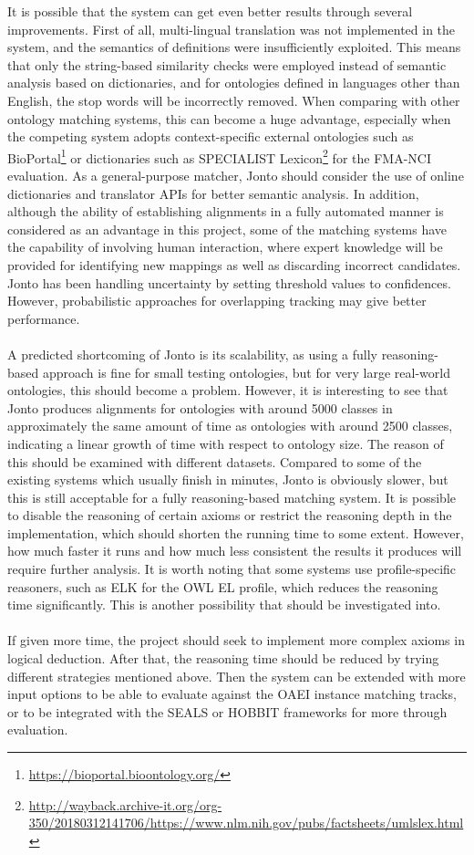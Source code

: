 It is possible that the system can get even better results through several improvements. First of all, multi-lingual translation was not implemented in the system, and the semantics of definitions were insufficiently exploited. This means that only the string-based similarity checks were employed instead of semantic analysis based on dictionaries, and for ontologies defined in languages other than English, the stop words will be incorrectly removed. When comparing with other ontology matching systems, this can become a huge advantage, especially when the competing system adopts context-specific external ontologies such as BioPortal\footnote{\url{https://bioportal.bioontology.org/}} or dictionaries such as SPECIALIST Lexicon\footnote{\url{http://wayback.archive-it.org/org-350/20180312141706/https://www.nlm.nih.gov/pubs/factsheets/umlslex.html}} for the FMA-NCI evaluation. As a general-purpose matcher, Jonto should consider the use of online dictionaries and translator APIs for better semantic analysis. In addition, although the ability of establishing alignments in a fully automated manner is considered as an advantage in this project, some of the matching systems have the capability of involving human interaction, where expert knowledge will be provided for identifying new mappings as well as discarding incorrect candidates. Jonto has been handling uncertainty by setting threshold values to confidences. However, probabilistic approaches for overlapping tracking may give better performance.
\\\\
A predicted shortcoming of Jonto is its scalability, as using a fully reasoning-based approach is fine for small testing ontologies, but for very large real-world ontologies, this should become a problem. However, it is interesting to see that Jonto produces alignments for ontologies with around 5000 classes in approximately the same amount of time as ontologies with around 2500 classes, indicating a linear growth of time with respect to ontology size. The reason of this should be examined with different datasets. Compared to some of the existing systems which usually finish in minutes, Jonto is obviously slower, but this is still acceptable for a fully reasoning-based matching system. It is possible to disable the reasoning of certain axioms or restrict the reasoning depth in the implementation, which should shorten the running time to some extent. However, how much faster it runs and how much less consistent the results it produces will require further analysis. It is worth noting that some systems use profile-specific reasoners, such as ELK for the OWL EL profile, which reduces the reasoning time significantly. This is another possibility that should be investigated into.
\\\\
If given more time, the project should seek to implement more complex axioms in logical deduction. After that, the reasoning time should be reduced by trying different strategies mentioned above. Then the system can be extended with more input options to be able to evaluate against the OAEI instance matching tracks, or to be integrated with the SEALS or HOBBIT frameworks for more through evaluation.

